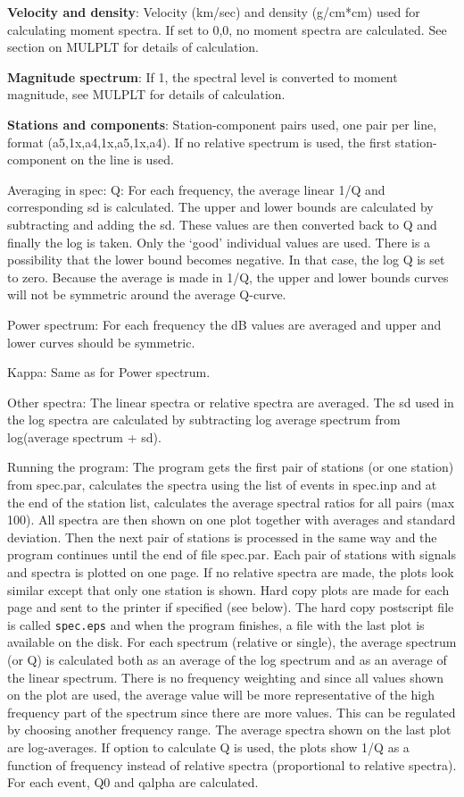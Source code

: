 \textbf{Velocity and density}: Velocity (km/sec) and density (g/cm*cm) used for calculating moment spectra. If set to 0,0, no moment spectra are calculated. See section on MULPLT for details of calculation. 

\textbf{Magnitude spectrum}: If 1, the spectral level is converted to moment magnitude, see MULPLT for details of calculation. 

\textbf{Stations and components}: Station-component pairs used, one pair per line, format (a5,1x,a4,1x,a5,1x,a4). If no relative spectrum is used, the first station-component on the line is used. 

Averaging in spec: \newline
Q: For each frequency, the average linear 1/Q and corresponding sd is calculated. The upper and lower bounds are calculated by subtracting and adding the sd. These values are then converted back to Q and finally the log is taken. Only the `good' individual values are used. There is a possibility that the lower bound becomes negative. In that case, the log Q is set to zero. Because the average is made in 1/Q, the upper and lower bounds curves will not be symmetric around the average Q-curve. 

Power spectrum: For each frequency the dB values are averaged and upper and lower curves should be symmetric. 

Kappa: Same as for Power spectrum. 

Other spectra: The linear spectra or relative spectra are averaged. The sd used in the log spectra are calculated by subtracting log average spectrum from log(average spectrum + sd). 

Running the program: \newline
The program gets the first pair of stations (or one station) from spec.par, calculates the spectra using the list of events in spec.inp and at the end of the station list, calculates the average spectral ratios for all pairs (max 100). All spectra are then shown on one plot together with averages and standard deviation. Then the next pair of stations is processed in the same way and the program continues until the end of file spec.par. Each pair of stations with signals and spectra is plotted on one page. If no relative spectra are made, the plots look similar except that only one station is shown. Hard copy plots are made for each page and sent to the printer if specified (see below). The hard copy postscript file is called \texttt{spec.eps} and when the program finishes, a file with the last plot is available on the disk. For each spectrum (relative or single), the average spectrum (or Q) is calculated both as an average of the log spectrum and as an average of the linear spectrum. There is no frequency weighting and since all values shown on the plot are used, the average value will be more representative of the high frequency part of the spectrum since there are more values. This can be regulated by choosing 
another frequency range. The average spectra shown on the last plot are log-averages. If option to calculate Q is used, the plots show 1/Q as a function of frequency instead of relative spectra (proportional to relative spectra). For each event,  Q0 and qalpha are calculated. 

